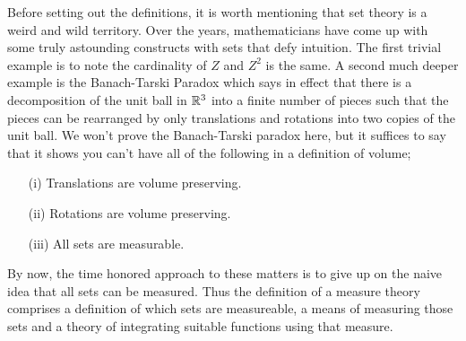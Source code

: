 \documentclass{amsart}
\theoremstyle{remark}
\theoremstyle{definition}
\begin{document}
Before setting out the definitions, it is worth mentioning that set
theory is a weird and wild territory.  Over the years, mathematicians
have come up with some truly astounding constructs with sets that defy
intuition. The first trivial example is to note the cardinality of $Z$
and $Z^2$ is the same.  A second much deeper example is the
Banach-Tarski Paradox which says in effect that there is a
decomposition of the unit ball in $\mathbb{R}^3$ into a finite number of
pieces such that the pieces can be rearranged by only translations and
rotations into two copies of the unit ball.  We won't prove the
Banach-Tarski paradox here, but it suffices to say that it shows you
can't have all of the following in a definition of volume;
\begin{itemize}
\item[(i)]Translations are volume preserving.
\item[(ii)]Rotations are volume preserving.
\item[(iii)]All sets are measurable.
\end{itemize}

By now, the time honored approach to these matters is to give up on
the naive idea that all sets can be measured.  Thus the definition of a measure theory comprises a definition of
which sets are measureable, a means of measuring those sets and a
theory of integrating suitable functions using that measure.
\end{document}
